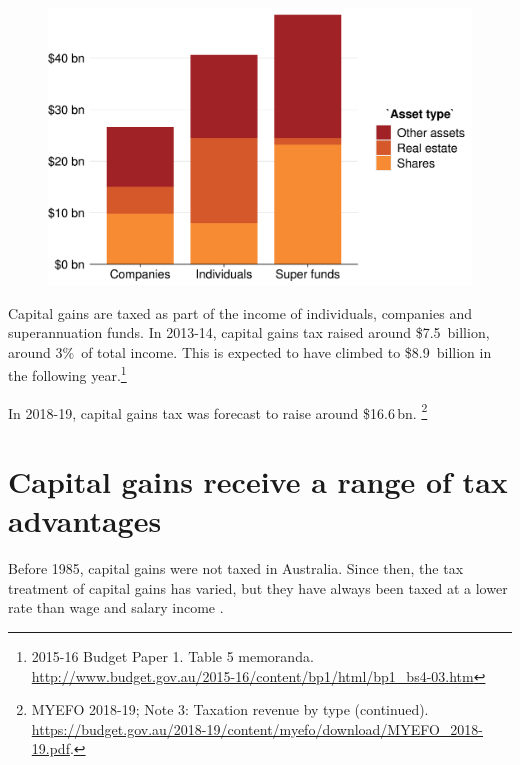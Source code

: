 \documentclass{grattan}\usepackage[]{graphicx}\usepackage[]{color}
\begin{document}
\begin{figure}
\includegraphics[width=\columnwidth]{CGT-NG-atlas//CGT-by-entity-asset-1}
\end{figure}

Capital gains are taxed as part of the income of individuals, companies and superannuation funds. In 2013-14, capital gains tax raised around \$7.5~billion, around 3\%\ of total income. This is expected to have climbed to \$8.9~billion in the following year.\footnote{2015-16 Budget Paper 1. Table 5 memoranda. \url{http://www.budget.gov.au/2015-16/content/bp1/html/bp1_bs4-03.htm}}

In 2018-19, capital gains tax was forecast to raise around \$16.6\,bn.%
  \footnote{MYEFO 2018-19; Note 3: Taxation revenue by type (continued). 
  \textcolor{blue}{\url{https://budget.gov.au/2018-19/content/myefo/download/MYEFO_2018-19.pdf}}.}


\section{Capital gains receive a range of tax advantages}
Before 1985, capital gains were not taxed in Australia. Since then, the tax treatment of capital gains has varied, but they have always been taxed at a lower rate than wage and salary income . 
\end{document}
